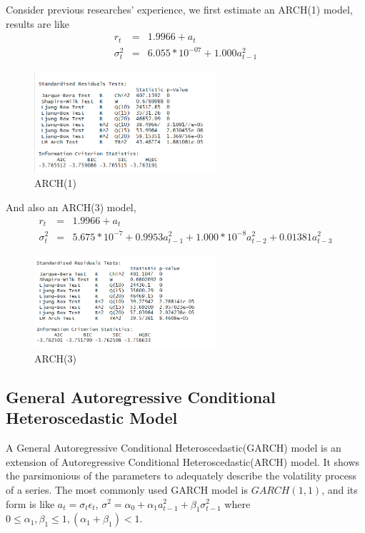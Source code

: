 \documentclass[12pt, a4paper, titlepage]{article}
\begin{document}
Consider previous researches' experience, we first estimate an ARCH(1) model, results are like
\begin{eqnarray*}
r_t &=& 1.9966 + a_t\\
\sigma_t^2 &=& 6.055*10^{-07} + 1.000 a_{t-1}^2 
\end{eqnarray*}
\begin{figure}[h!]
\begin{center}
\caption{ARCH(1)}\label{ARCH(1)}
\includegraphics[width=0.6\textwidth]{arch1a.png} 
\end{center}
\end{figure}

And also an ARCH(3) model,
\begin{eqnarray*}
r_t &=& 1.9966 + a_t\\
\sigma_t^2 &=& 5.675*10^{-7} + 0.9953 a_{t-1}^2 + 1.000*10^{-8} a_{t-2}^2 +0.01381 a_{t-3}^2
\end{eqnarray*}
\begin{figure}[h!]
\begin{center}
\caption{ARCH(3)}\label{ARCH(3)}
\includegraphics[width=0.6\textwidth]{arch3a.png} 
\end{center}
\end{figure}


\subsection{General Autoregressive Conditional Heteroscedastic Model}
A General Autoregressive Conditional Heteroscedastic(GARCH) model is an extension of Autoregressive Conditional Heteroscedastic(ARCH) model. It shows the parsimonious of the parameters to adequately describe the volatility process of a series. The most commonly used GARCH model is $GARCH(1,1)$, and its form is like $a_t = \sigma_t \epsilon_t$, $\sigma^2 = \alpha_0 + \alpha_1 a_{t-1}^2 + \beta_1 \sigma_{t-1}^2$ where $0 \leq \alpha_1, \beta_1 \leq 1, (\alpha_1 + \beta_1) <1$.\\ 
\end{document}
